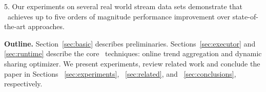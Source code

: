 5. Our experiments on several real world  stream  data sets  demonstrate that \app\ achieves up to five orders of magnitude performance improvement over state-of-the-art approaches.

\textbf{Outline.} 
Section~\ref{sec:basic} describes preliminaries.
Sections~\ref{sec:executor} and \ref{sec:runtime} describe the core \app\ techniques: online trend aggregation and dynamic sharing optimizer. 
We present experiments,
review related work  and 
conclude the paper in Sections ~\ref{sec:experiments}, 
~\ref{sec:related}, and 
~\ref{sec:conclusions}, respectively.

